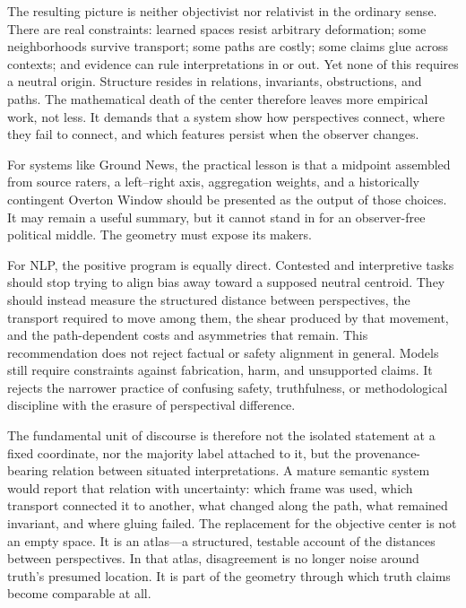 The resulting picture is neither objectivist nor relativist in the ordinary sense. There are real constraints: learned spaces resist arbitrary deformation; some neighborhoods survive transport; some paths are costly; some claims glue across contexts; and evidence can rule interpretations in or out. Yet none of this requires a neutral origin. Structure resides in relations, invariants, obstructions, and paths. The mathematical death of the center therefore leaves more empirical work, not less. It demands that a system show how perspectives connect, where they fail to connect, and which features persist when the observer changes.

For systems like Ground News, the practical lesson is that a midpoint assembled from source raters, a left--right axis, aggregation weights, and a historically contingent Overton Window should be presented as the output of those choices. It may remain a useful summary, but it cannot stand in for an observer-free political middle. The geometry must expose its makers.

For NLP, the positive program is equally direct. Contested and interpretive tasks should stop trying to align bias away toward a supposed neutral centroid. They should instead measure the structured distance between perspectives, the transport required to move among them, the shear produced by that movement, and the path-dependent costs and asymmetries that remain. This recommendation does not reject factual or safety alignment in general. Models still require constraints against fabrication, harm, and unsupported claims. It rejects the narrower practice of confusing safety, truthfulness, or methodological discipline with the erasure of perspectival difference.

The fundamental unit of discourse is therefore not the isolated statement at a fixed coordinate, nor the majority label attached to it, but the provenance-bearing relation between situated interpretations. A mature semantic system would report that relation with uncertainty: which frame was used, which transport connected it to another, what changed along the path, what remained invariant, and where gluing failed. The replacement for the objective center is not an empty space. It is an atlas---a structured, testable account of the distances between perspectives. In that atlas, disagreement is no longer noise around truth's presumed location. It is part of the geometry through which truth claims become comparable at all.




